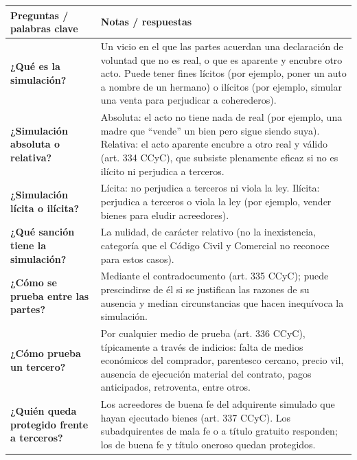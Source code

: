 \documentclass[12pt,oneside]{book}
\begin{document}
\begin{table}[H]
\centering
\begin{tabularx}{\textwidth}{
    >{\raggedright\arraybackslash}p{}
    >{\raggedright\arraybackslash}X
}
\toprule
\textbf{Preguntas / palabras clave} &
\textbf{Notas / respuestas} \\
\midrule

\textbf{¿Qué es la simulación?} &
Un vicio en el que las partes acuerdan una declaración de voluntad que no es real, o que es aparente y encubre otro acto. Puede tener fines lícitos (por ejemplo, poner un auto a nombre de un hermano) o ilícitos (por ejemplo, simular una venta para perjudicar a coherederos). \\

\textbf{¿Simulación absoluta o relativa?} &
Absoluta: el acto no tiene nada de real (por ejemplo, una madre que ``vende'' un bien pero sigue siendo suya). Relativa: el acto aparente encubre a otro real y válido (art. 334 CCyC), que subsiste plenamente eficaz si no es ilícito ni perjudica a terceros. \\

\textbf{¿Simulación lícita o ilícita?} &
Lícita: no perjudica a terceros ni viola la ley. Ilícita: perjudica a terceros o viola la ley (por ejemplo, vender bienes para eludir acreedores). \\

\textbf{¿Qué sanción tiene la simulación?} &
La nulidad, de carácter relativo (no la inexistencia, categoría que el Código Civil y Comercial no reconoce para estos casos). \\

\textbf{¿Cómo se prueba entre las partes?} &
Mediante el contradocumento (art. 335 CCyC); puede prescindirse de él si se justifican las razones de su ausencia y median circunstancias que hacen inequívoca la simulación. \\

\textbf{¿Cómo prueba un tercero?} &
Por cualquier medio de prueba (art. 336 CCyC), típicamente a través de indicios: falta de medios económicos del comprador, parentesco cercano, precio vil, ausencia de ejecución material del contrato, pagos anticipados, retroventa, entre otros. \\

\textbf{¿Quién queda protegido frente a terceros?} &
Los acreedores de buena fe del adquirente simulado que hayan ejecutado bienes (art. 337 CCyC). Los subadquirentes de mala fe o a título gratuito responden; los de buena fe y título oneroso quedan protegidos. \\


\end{tabularx}
\end{table}
\end{document}
